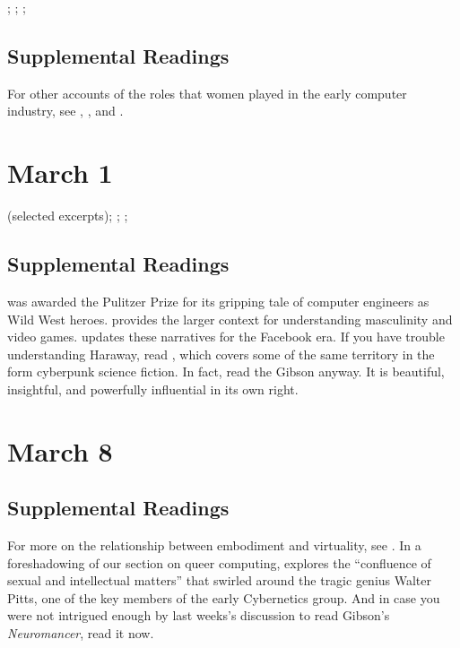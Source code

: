 \documentclass[11pt]{article}
\renewcommand{\cite}{\textcite}
\begin{document}
; ; ; 


\subsection{Supplemental Readings}

For other accounts of the roles that women played in the early computer industry, see \cite{Shetterly:2016vl}, \cite{Grier:2005tq}, and \cite{Gurer:1996it}.


\section{March 1}

(selected excerpts); ; ; 

\subsection{Supplemental Readings}

\cite{Kidder:1981tj} was awarded the Pulitzer Prize for its gripping tale of computer engineers as Wild West heroes. \cite{Kocurek:2015cg} provides the larger context for understanding masculinity and video games.   \cite{Losse:2012um} updates these narratives for the Facebook era. If you have trouble understanding Haraway, read \cite{Gibson:1995un}, which covers some of the same territory in the form cyberpunk science fiction.  In fact, read the Gibson anyway.  It is beautiful, insightful, and powerfully influential in its own right.



\section{March 8}


\subsection{Supplemental Readings}

For more on the relationship between embodiment and virtuality, see \cite{Stone:1996wp}.  In a foreshadowing of our section on queer computing, \cite{Wilson:2009wm} explores the ``confluence of sexual and intellectual matters'' that swirled around the tragic genius Walter Pitts, one of the key members of the early Cybernetics group. And in case you were not intrigued enough by last weeks's discussion to read Gibson's \emph{Neuromancer}, read it now.
\end{document}
